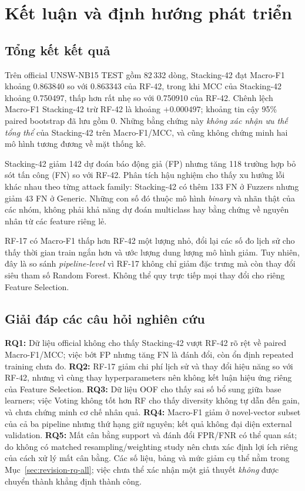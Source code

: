 \section{Kết luận và định hướng phát triển}
\label{chap:ket-luan}

\subsection{Tổng kết kết quả}
Trên official UNSW-NB15 TEST gồm 82\,332 dòng, Stacking-42 đạt Macro-F1 khoảng 0.863840 so với 0.863343 của RF-42, trong khi MCC của Stacking-42 khoảng 0.750497, thấp hơn rất nhẹ so với 0.750910 của RF-42. Chênh lệch Macro-F1 Stacking-42 trừ RF-42 là khoảng $+0.000497$; khoảng tin cậy 95\% paired bootstrap đã lưu gồm 0. Những bằng chứng này \emph{không xác nhận ưu thế tổng thể} của Stacking-42 trên Macro-F1/MCC, và cũng không chứng minh hai mô hình tương đương về mặt thống kê.

Stacking-42 giảm 142 dự đoán báo động giả (FP) nhưng tăng 118 trường hợp bỏ sót tấn công (FN) so với RF-42. Phân tích hậu nghiệm cho thấy xu hướng lỗi khác nhau theo từng attack family: Stacking-42 có thêm 133 FN ở Fuzzers nhưng giảm 43 FN ở Generic. Những con số đó thuộc mô hình \emph{binary} và nhãn thật của các nhóm, không phải khả năng dự đoán multiclass hay bằng chứng về nguyên nhân từ các feature riêng lẻ.

RF-17 có Macro-F1 thấp hơn RF-42 một lượng nhỏ, đổi lại các số đo lịch sử cho thấy thời gian train ngắn hơn và ước lượng dung lượng mô hình giảm. Tuy nhiên, đây là so sánh \emph{pipeline-level} vì RF-17 không chỉ giảm đặc trưng mà còn thay đổi siêu tham số Random Forest. Không thể quy trực tiếp mọi thay đổi cho riêng Feature Selection.

\subsection{Giải đáp các câu hỏi nghiên cứu}
\textbf{RQ1:} Dữ liệu official không cho thấy Stacking-42 vượt RF-42 rõ rệt về paired Macro-F1/MCC; việc bớt FP nhưng tăng FN là đánh đổi, còn ổn định repeated training chưa đo.
\textbf{RQ2:} RF-17 giảm chi phí lịch sử và thay đổi hiệu năng so với RF-42, nhưng vì cùng thay hyperparameters nên không kết luận hiệu ứng riêng của Feature Selection.
\textbf{RQ3:} Dữ liệu OOF cho thấy sai số bổ sung giữa base learners; việc Voting không tốt hơn RF cho thấy diversity không tự dẫn đến gain, và chưa chứng minh cơ chế nhân quả.
\textbf{RQ4:} Macro-F1 giảm ở novel-vector subset của cả ba pipeline nhưng thứ hạng giữ nguyên; kết quả không đại diện external validation.
\textbf{RQ5:} Mất cân bằng support và đánh đổi FPR/FNR có thể quan sát; do không có matched resampling/weighting study nên chưa xác định lợi ích riêng của cách xử lý mất cân bằng.
Các số liệu, bảng và mức giảm cụ thể nằm trong Mục~\ref{sec:revision-rq-all}; việc chưa thể xác nhận một giả thuyết \emph{không} được chuyển thành khẳng định thành công.

